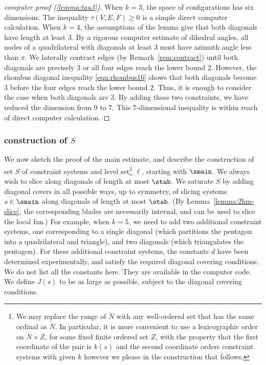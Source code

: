 \begin{proof}[computer proof (\ref{lemma:tau3})]
  When $k=3$, the space of configurations has six dimensions.  The
  inequality $\tau(V,E,F)\ge0$ is a simple direct computer calculation.  When
  $k=4$, the assumptions of the lemma give that both diagonals have
  length at least $3$.  By a rigorous computer estimate of dihedral
  angles, all nodes of a quadrilateral with diagonals at least $3$
  must have azimuth angle less than $\pi$.  We laterally contract edges (by
  Remark~\ref{rem:contract}) until both diagonals are precisely $3$ or
  all four edges reach the lower bound $2$.  However, the rhombus
  diagonal inequality \eqref{eqn:rhombus16} shows that both diagonals
  become $3$ before the four edges reach the lower bound $2$.  Thus,
  it is enough to consider the case when both diagonals are $3$.  By
  adding these two constraints, we have reduced the dimension from $9$
  to $7$. This $7$-dimensional inequality is within reach of direct
  computer calculation.
\end{proof}


\subsubsection{construction of $S$}

We now sketch the proof of the main estimate, and describe the
construction of set $S$ of constraint systems and level
set\footnote{We may replace the range of $\ring{N}$ with any
  well-ordered set that has the same ordinal as $\ring{N}$.  In
  particular, it is more convenient to use a lexicographic order on
  $\ring{N}\times Z$, for some fixed finite ordered set $Z$, with the
  property that the first coordinate of the pair is $k(s)$ and the
  second coordinate orders constraint systems with given $k$ however
  we please in the construction that follows.}  $\ell$, starting with
$\smain$.  We always wish to slice along diagonals of length at most
$\stab$.  We saturate $S$ by adding diagonal covers in all possible
ways, up to symmetry, of slicing systems $s\in \smain$ along diagonals
of length at most $\stab$.  (By Lemma~\ref{lemma:2hm-slice}, the
corresponding blades are necessarily internal, and can be used to
slice the local fan.)  For example, when $k=5$, we need to add two
additional constraint systems, one corresponding to a
single diagonal (which partitions the pentagon into a quadrilateral
and triangle), and two diagonals (which triangulates the pentagon).
For these additional constraint systems, the constants $d$ have been
determined experimentally, and satisfy the required diagonal covering
conditions.  We do not list all the constants here.  They are
available in the computer code.  We define $J(s)$ to be as large as
possible, subject to the diagonal covering conditions.

